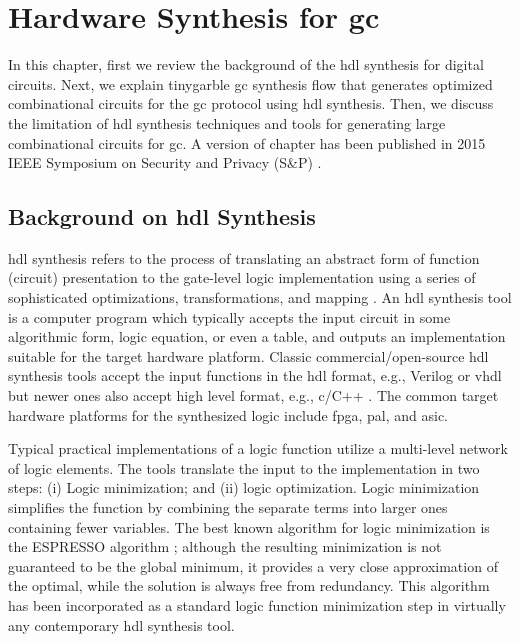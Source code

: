 \chapter{Hardware Synthesis for \acrshort{gc}}\label{chap:syn}
In this chapter, first we review the background of the \acrshort{hdl} synthesis for digital circuits.
Next, we explain \gls{tinygarble} \acrshort{gc} synthesis flow that generates optimized combinational circuits for the \acrshort{gc} protocol using \acrshort{hdl} synthesis.
Then, we discuss the limitation of \acrshort{hdl} synthesis techniques and tools for generating large combinational circuits for \acrshort{gc}.
A version of chapter has been published in 2015 IEEE Symposium on Security and Privacy (S\&P) \cite{songhori2015tinygarble}.

\section{Background on \acrshort{hdl} Synthesis}\label{sec:syn-back}
\acrshort{hdl} synthesis refers to the process of translating an abstract form of  function (circuit) presentation to the gate-level logic implementation using a series of sophisticated optimizations, transformations, and mapping \cite{sentovich1992sis,micheli1994synthesis,devadas1994logic,brayton1987mis}.
An \acrshort{hdl} synthesis tool is a computer program which typically accepts the input circuit in some algorithmic form, logic equation, or even a table, and outputs an implementation suitable for the target hardware platform.
Classic commercial/open-source \acrshort{hdl} synthesis tools accept the input functions in the \acrshort{hdl} format, e.g., Verilog or \gls{vhdl} \cite{tool:DesignCompiler,tool:ABC,tool:Encounter,tool:HDLdesigner,tool:PandA,decaluwe2004myhdl} but newer ones also accept high level format, e.g., \gls{c}/C++ \cite{Gupta2004, tool:Vivado}.
The common target hardware platforms for the synthesized logic include \acrfull{fpga}, \acrfull{pal}, and \acrfull{asic}.

Typical practical implementations of a logic function utilize a multi-level network of logic elements.
The tools translate the input to the implementation in two steps: (i) Logic minimization; and (ii) logic optimization.
Logic minimization simplifies the function by combining the separate terms into larger ones containing fewer variables.
The best known algorithm for logic minimization is the ESPRESSO algorithm \cite{brayton1984logic}; although the resulting minimization is not guaranteed to be the global minimum, it provides a very close approximation of the optimal, while the solution is always free from redundancy.
This algorithm has been incorporated as a standard logic function minimization step in virtually any contemporary \acrshort{hdl} synthesis tool.

